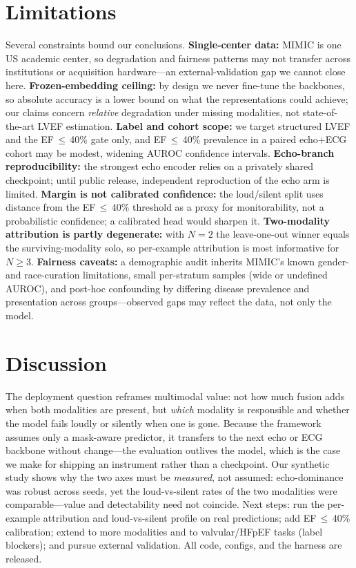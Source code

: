 \documentclass{article}
\begin{document}
\section{Limitations}
\label{sec:limitations}
Several constraints bound our conclusions. \textbf{Single-center data:} MIMIC is one US academic
center, so degradation and fairness patterns may not transfer across institutions or acquisition
hardware---an external-validation gap we cannot close here. \textbf{Frozen-embedding ceiling:} by
design we never fine-tune the backbones, so absolute accuracy is a lower bound on what the
representations could achieve; our claims concern \emph{relative} degradation under missing
modalities, not state-of-the-art LVEF estimation. \textbf{Label and cohort scope:} we target
structured LVEF and the \mbox{EF\,$\leq$\,40\%} gate only, and \mbox{EF\,$\leq$\,40\%} prevalence in
a paired echo+ECG cohort may be modest, widening AUROC confidence intervals. \textbf{Echo-branch
reproducibility:} the strongest echo encoder relies on a privately shared checkpoint; until public
release, independent reproduction of the echo arm is limited. \textbf{Margin is not calibrated
confidence:} the loud/silent split uses distance from the \mbox{EF\,$\leq$\,40\%} threshold as a
proxy for monitorability, not a probabilistic confidence; a calibrated head would sharpen it.
\textbf{Two-modality attribution is partly degenerate:} with $N{=}2$ the leave-one-out winner
equals the surviving-modality solo, so per-example attribution is most informative for $N{\ge}3$.
\textbf{Fairness caveats:} a demographic audit inherits MIMIC's known gender- and race-curation
limitations, small per-stratum samples (wide or undefined AUROC), and post-hoc confounding by
differing disease prevalence and presentation across groups---observed gaps may reflect the data,
not only the model.

\section{Discussion}
\label{sec:discussion}
The deployment question reframes multimodal value: not how much fusion adds when both modalities
are present, but \emph{which} modality is responsible and whether the model fails loudly or
silently when one is gone. Because the framework assumes only a mask-aware predictor, it transfers
to the next echo or ECG backbone without change---the evaluation outlives the model, which is the
case we make for shipping an instrument rather than a checkpoint. Our synthetic study shows
why the two axes must be \emph{measured}, not assumed: echo-dominance was robust across seeds, yet
the loud-vs-silent rates of the two modalities were comparable---value and detectability need not
coincide. Next steps: run the per-example attribution and loud-vs-silent
profile on real predictions; add \mbox{EF\,$\leq$\,40\%} calibration; extend to more modalities and
to valvular/HFpEF tasks (label blockers); and pursue external validation. All code, configs, and the
harness are released.
\end{document}
